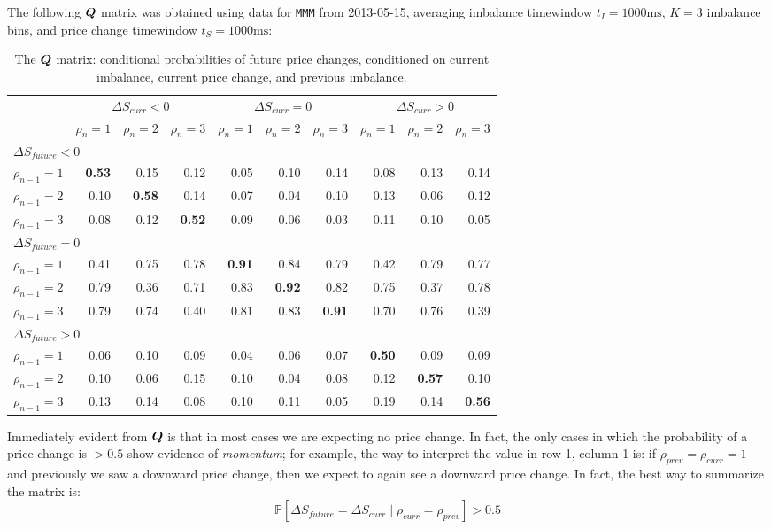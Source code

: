 The following $\boldsymbol{Q}$ matrix was obtained using data for \texttt{MMM} from 2013-05-15, averaging imbalance timewindow $t_I = 1000\text{ms}$, $K=3$ imbalance bins, and price change timewindow $t_S = 1000\text{ms}$:
\begin{table}[H]
\centering
{}
\begin{tabular}{@{} *{10}{r} @{}}
\toprule
& \multicolumn{3}{c}{$\Delta S_{curr} < 0$} & \multicolumn{3}{c}{$\Delta S_{curr} = 0$} & \multicolumn{3}{c}{$\Delta S_{curr} > 0$} \\
\cmidrule(lr){2-4} \cmidrule(lr){5-7} \cmidrule(lr){8-10}
&  $\rho_{n} = 1$ & $\rho_{n} = 2$ & $\rho_{n} = 3$ & $\rho_{n} = 1$ & $\rho_{n} = 2$ & $\rho_{n} = 3$ & $\rho_{n} = 1$ & $\rho_{n} = 2$ & $\rho_{n} = 3$ \\
\midrule
\multicolumn{10}{l}{$\Delta S_{future} < 0$} \\
$\rho_{n-1} = 1$ & \bf 0.53 & 0.15 & 0.12 & 0.05 & 0.10 & 0.14 & 0.08 & 0.13 & 0.14 \\
$\rho_{n-1} = 2$ & 0.10 & \bf 0.58 & 0.14 & 0.07 & 0.04 & 0.10 & 0.13 & 0.06 & 0.12 \\
$\rho_{n-1} = 3$ & 0.08 & 0.12 & \bf 0.52 & 0.09 & 0.06 & 0.03 & 0.11 & 0.10 & 0.05 \\[0.6ex]
\multicolumn{10}{l}{$\Delta S_{future} = 0$} \\
$\rho_{n-1} = 1$ & 0.41 & 0.75 & 0.78 & \bf 0.91 & 0.84 & 0.79 & 0.42 & 0.79 & 0.77 \\
$\rho_{n-1} = 2$ & 0.79 & 0.36 & 0.71 & 0.83 & \bf 0.92 & 0.82 & 0.75 & 0.37 & 0.78 \\
$\rho_{n-1} = 3$ & 0.79 & 0.74 & 0.40 & 0.81 & 0.83 & \bf 0.91 & 0.70 & 0.76 & 0.39 \\[0.6ex]
\multicolumn{10}{l}{$\Delta S_{future} > 0$} \\
$\rho_{n-1} = 1$ & 0.06 & 0.10 & 0.09 & 0.04 & 0.06 & 0.07 & \bf 0.50 & 0.09 & 0.09 \\
$\rho_{n-1} = 2$ & 0.10 & 0.06 & 0.15 & 0.10 & 0.04 & 0.08 & 0.12 & \bf 0.57 & 0.10 \\
$\rho_{n-1} = 3$ & 0.13 & 0.14 & 0.08 & 0.10 & 0.11 & 0.05 & 0.19 & 0.14 & \bf 0.56 \\
\bottomrule
\end{tabular}
\caption{The $\boldsymbol{Q}$ matrix: conditional probabilities of future price changes, conditioned on current imbalance, current price change, and previous imbalance.}
\label{tbl:Qmatrix}
\end{table}

Immediately evident from $\boldsymbol{Q}$ is that in most cases we are expecting no price change. In fact, the only cases in which the probability of a price change is $>0.5$ show evidence of \textit{momentum}; for example, the way to interpret the value in row 1, column 1 is: if $\rho_{prev} = \rho_{curr} = 1$ and previously we saw a downward price change, then we expect to again see a downward price change. In fact, the best way to summarize the matrix is:
\begin{equation}\label{eq:EDAKeyInsight}
\mathbb{P} \left[ \Delta S_{future} = \Delta S_{curr} \; | \; \rho_{curr} = \rho_{prev} \right] > 0.5
\end{equation} 

